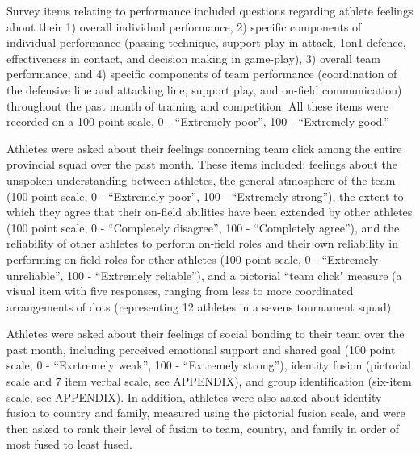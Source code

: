 Survey items relating to performance included questions regarding athlete feelings about their 1) overall individual performance, 2) specific components of individual performance (passing technique, support play in attack, 1on1 defence, effectiveness in contact, and decision making in game-play), 3) overall team performance, and 4) specific components of team performance (coordination of the defensive line and attacking line, support play, and on-field communication) throughout the past month of training and competition.  All these items were recorded on a 100 point scale, 0 - ``Extremely poor'', 100 - ``Extremely good.''

Athletes were asked about their feelings concerning team click among the entire provincial squad over the past month.  These items included: feelings about the unspoken understanding between athletes, the general atmosphere of the team (100 point scale, 0 - ``Extremely poor'', 100 - ``Extremely strong''), the extent to which they agree that their on-field abilities have been extended by other athletes (100 point scale, 0 - ``Completely disagree'', 100 - ``Completely agree''), and the reliability of other athletes to perform on-field roles and their own reliability in performing on-field roles for other athletes (100 point scale, 0 - ``Extremely unreliable'', 100 - ``Extremely reliable''), and a pictorial ``team click" measure (a visual item with five responses, ranging from less to more coordinated arrangements of dots (representing 12 athletes in a sevens tournament squad).

Athletes were asked about their feelings of social bonding to their team over the past month, including perceived emotional support and shared goal (100 point scale, 0 - ``Exrtremely weak'', 100 - ``Extremely strong''), identity fusion (pictorial scale and 7 item verbal scale, see APPENDIX), and group identification (six-item scale, see APPENDIX). In addition, athletes were also asked about identity fusion to country and family, measured using the pictorial fusion scale, and were then asked to rank their level of fusion to team, country, and family in order of most fused to least fused.


